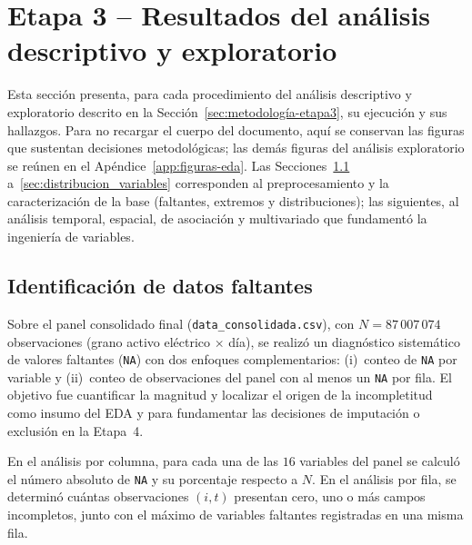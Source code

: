 \section{Etapa 3 – Resultados del análisis descriptivo y exploratorio}
\label{sec:resultados-etapa3}

Esta sección presenta, para cada procedimiento del análisis descriptivo y exploratorio descrito en la Sección~\ref{sec:metodología-etapa3}, su ejecución y sus hallazgos. Para no recargar el cuerpo del documento, aquí se conservan las figuras que sustentan decisiones metodológicas; las demás figuras del análisis exploratorio se reúnen en el Apéndice~\ref{app:figuras-eda}. Las Secciones~\ref{sec:identificacion_datos_faltantes} a~\ref{sec:distribucion_variables} corresponden al preprocesamiento y la caracterización de la base (faltantes, extremos y distribuciones); las siguientes, al análisis temporal, espacial, de asociación y multivariado que fundamentó la ingeniería de variables.

\subsection{Identificación de datos faltantes}
\label{sec:identificacion_datos_faltantes}
    Sobre el panel consolidado final (\texttt{data\_consolidada.csv}), con $N = 87\,007\,074$ observaciones (grano activo eléctrico $\times$ día), se realizó un diagnóstico sistemático de valores faltantes (\texttt{NA}) con dos enfoques complementarios: (i)~conteo de \texttt{NA} por variable y (ii)~conteo de observaciones del panel con al menos un \texttt{NA} por fila. El objetivo fue cuantificar la magnitud y localizar el origen de la incompletitud como insumo del EDA y para fundamentar las decisiones de imputación o exclusión en la Etapa~4.
    
    En el análisis por columna, para cada una de las $16$ variables del panel se calculó el número absoluto de \texttt{NA} y su porcentaje respecto a $N$. En el análisis por fila, se determinó cuántas observaciones $(i,t)$ presentan cero, uno o más campos incompletos, junto con el máximo de variables faltantes registradas en una misma fila.
    
